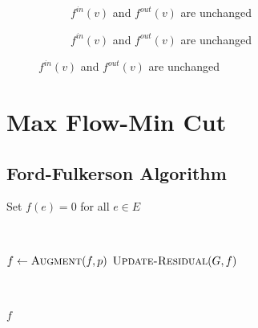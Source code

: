 \begin{itemize}
\begin{itemize}
\begin{figure}[ht!]
\begin{subfigure}{0.45\linewidth}
                \caption*{$f^{in}(v)$ and $f^{out}(v)$ are unchanged}
            \end{subfigure}
            \hfil%
            \begin{subfigure}{0.45\linewidth}
                \centering

                \caption*{$f^{in}(v)$ and $f^{out}(v)$ are unchanged}
            \end{subfigure}
        \end{figure}
    \end{itemize}
\end{itemize}

\section{Max Flow-Min Cut}

\subsection{Ford-Fulkerson Algorithm}

\begin{algorithm}[ht!]
    \begin{algorithmic}[1]
            \State Set $f(e) = 0$ for all $e \in E$

            {~~~}

                \State $f \gets \Call{Augment}{f, p}$
                \State $\Call{Update-Residual}{G, f}$
            \EndWhile

            {~~~}

            \State \Return $f$
        \EndFunction
    \end{algorithmic}
\end{algorithm}

